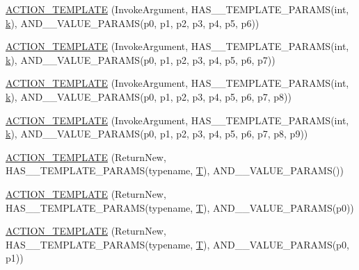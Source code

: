 \begin{DoxyCompactItemize}
\item 
\hyperlink{namespacetesting_a8d3590561f334d165c620f522219831b}{A\+C\+T\+I\+O\+N\+\_\+\+T\+E\+M\+P\+L\+A\+TE} (Invoke\+Argument, H\+A\+S\+\_\+\_\+\+T\+E\+M\+P\+L\+A\+T\+E\+\_\+\+P\+A\+R\+A\+MS(int, \hyperlink{jquery_8js_ab26645c014aa005ecedef329ecf58c99}{k}), A\+N\+D\+\_\+\_\+\+V\+A\+L\+U\+E\+\_\+\+P\+A\+R\+A\+MS(p0, p1, p2, p3, p4, p5, p6))
\item 
\hyperlink{namespacetesting_a8725892aafb62cc8f6f76280d29595d8}{A\+C\+T\+I\+O\+N\+\_\+\+T\+E\+M\+P\+L\+A\+TE} (Invoke\+Argument, H\+A\+S\+\_\+\_\+\+T\+E\+M\+P\+L\+A\+T\+E\+\_\+\+P\+A\+R\+A\+MS(int, \hyperlink{jquery_8js_ab26645c014aa005ecedef329ecf58c99}{k}), A\+N\+D\+\_\+\_\+\+V\+A\+L\+U\+E\+\_\+\+P\+A\+R\+A\+MS(p0, p1, p2, p3, p4, p5, p6, p7))
\item 
\hyperlink{namespacetesting_a910551adbfeb1854071ef55ae54a5c0f}{A\+C\+T\+I\+O\+N\+\_\+\+T\+E\+M\+P\+L\+A\+TE} (Invoke\+Argument, H\+A\+S\+\_\+\_\+\+T\+E\+M\+P\+L\+A\+T\+E\+\_\+\+P\+A\+R\+A\+MS(int, \hyperlink{jquery_8js_ab26645c014aa005ecedef329ecf58c99}{k}), A\+N\+D\+\_\+\_\+\+V\+A\+L\+U\+E\+\_\+\+P\+A\+R\+A\+MS(p0, p1, p2, p3, p4, p5, p6, p7, p8))
\item 
\hyperlink{namespacetesting_ab7bf885ff274cbdc09f19c39e43b7f2b}{A\+C\+T\+I\+O\+N\+\_\+\+T\+E\+M\+P\+L\+A\+TE} (Invoke\+Argument, H\+A\+S\+\_\+\_\+\+T\+E\+M\+P\+L\+A\+T\+E\+\_\+\+P\+A\+R\+A\+MS(int, \hyperlink{jquery_8js_ab26645c014aa005ecedef329ecf58c99}{k}), A\+N\+D\+\_\+\_\+\+V\+A\+L\+U\+E\+\_\+\+P\+A\+R\+A\+MS(p0, p1, p2, p3, p4, p5, p6, p7, p8, p9))
\item 
\hyperlink{namespacetesting_a468e601467d018ab7566f321d3f7e871}{A\+C\+T\+I\+O\+N\+\_\+\+T\+E\+M\+P\+L\+A\+TE} (Return\+New, H\+A\+S\+\_\+\_\+\+T\+E\+M\+P\+L\+A\+T\+E\+\_\+\+P\+A\+R\+A\+MS(typename, \hyperlink{functions__7_8js_adf1f3edb9115acb0a1e04209b7a9937b}{T}), A\+N\+D\+\_\+\_\+\+V\+A\+L\+U\+E\+\_\+\+P\+A\+R\+A\+MS())
\item 
\hyperlink{namespacetesting_af07e911d69b8efb03bddbd0332f79ba0}{A\+C\+T\+I\+O\+N\+\_\+\+T\+E\+M\+P\+L\+A\+TE} (Return\+New, H\+A\+S\+\_\+\_\+\+T\+E\+M\+P\+L\+A\+T\+E\+\_\+\+P\+A\+R\+A\+MS(typename, \hyperlink{functions__7_8js_adf1f3edb9115acb0a1e04209b7a9937b}{T}), A\+N\+D\+\_\+\_\+\+V\+A\+L\+U\+E\+\_\+\+P\+A\+R\+A\+MS(p0))
\item 
\hyperlink{namespacetesting_ad418620ed637e789f91d029f4fe85b4b}{A\+C\+T\+I\+O\+N\+\_\+\+T\+E\+M\+P\+L\+A\+TE} (Return\+New, H\+A\+S\+\_\+\_\+\+T\+E\+M\+P\+L\+A\+T\+E\+\_\+\+P\+A\+R\+A\+MS(typename, \hyperlink{functions__7_8js_adf1f3edb9115acb0a1e04209b7a9937b}{T}), A\+N\+D\+\_\+\_\+\+V\+A\+L\+U\+E\+\_\+\+P\+A\+R\+A\+MS(p0, p1))

\end{DoxyCompactItemize}
